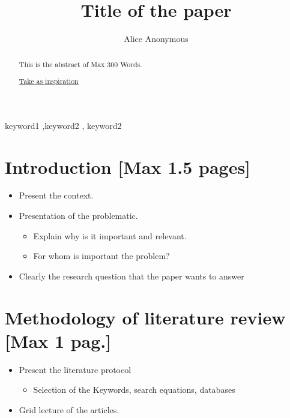 \documentclass[preprint, 3p,
authoryear]{elsarticle} %
\providecommand{\tightlist}{%
  \setlength{\itemsep}{0pt}\setlength{\parskip}{0pt}}
\begin{document}
\begin{frontmatter}

  \title{Title of the paper}
    \author[ENSGSI]{Alice Anonymous%
  }
  
  \begin{abstract}
  This is the abstract of Max 300 Words.

  \href{https://doi.org/10.1007/978-981-16-5248-6_15}{Take as
  inspiration}
  \end{abstract}
    \begin{keyword}
    keyword1 \sep keyword2 \sep 
    keyword2
  \end{keyword}
  
 \end{frontmatter}

\hypertarget{introduction-max-1.5-pages}{%
\section{Introduction {[}Max 1.5
pages{]}}\label{introduction-max-1.5-pages}}

\begin{itemize}
\tightlist
\item
  Present the context.
\item
  Presentation of the problematic.

  \begin{itemize}
  \tightlist
  \item
    Explain why is it important and relevant.
  \item
    For whom is important the problem?
  \end{itemize}
\item
  Clearly the research question that the paper wants to answer
\end{itemize}

\hypertarget{methodology-of-literature-review-max-1-pag.}{%
\section{Methodology of literature review {[}Max 1
pag.{]}}\label{methodology-of-literature-review-max-1-pag.}}

\begin{itemize}
\tightlist
\item
  Present the literature protocol

  \begin{itemize}
  \tightlist
  \item
    Selection of the Keywords, search equations, databases
  \end{itemize}
\item
  Grid lecture of the articles.
\end{itemize}
\end{document}
